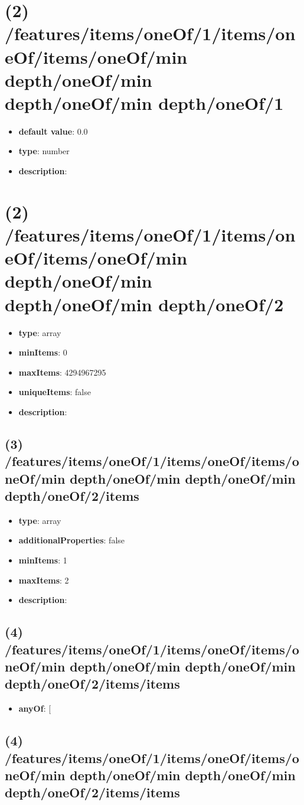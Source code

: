 \section{(2) /features/items/oneOf/1/items/oneOf/items/oneOf/min depth/oneOf/min depth/oneOf/min depth/oneOf/1}
\begin{itemize}[leftmargin=2em]\item {\bf default value}: 0.0
\item {\bf type}: number
\item {\bf description}: 
\end{itemize}\section{(2) /features/items/oneOf/1/items/oneOf/items/oneOf/min depth/oneOf/min depth/oneOf/min depth/oneOf/2}
\begin{itemize}[leftmargin=2em]\item {\bf type}: array
\item {\bf minItems}: 0
\item {\bf maxItems}: 4294967295
\item {\bf uniqueItems}: false
\item {\bf description}: 
\end{itemize}\subsection{(3) /features/items/oneOf/1/items/oneOf/items/oneOf/min depth/oneOf/min depth/oneOf/min depth/oneOf/2/items}
\begin{itemize}[leftmargin=3em]\item {\bf type}: array
\item {\bf additionalProperties}: false
\item {\bf minItems}: 1
\item {\bf maxItems}: 2
\item {\bf description}: 
\end{itemize}\subsection{(4) /features/items/oneOf/1/items/oneOf/items/oneOf/min depth/oneOf/min depth/oneOf/min depth/oneOf/2/items/items}
\begin{itemize}[leftmargin=4em]\item {\bf anyOf}: [\end{itemize}\subsection{(4) /features/items/oneOf/1/items/oneOf/items/oneOf/min depth/oneOf/min depth/oneOf/min depth/oneOf/2/items/items}
